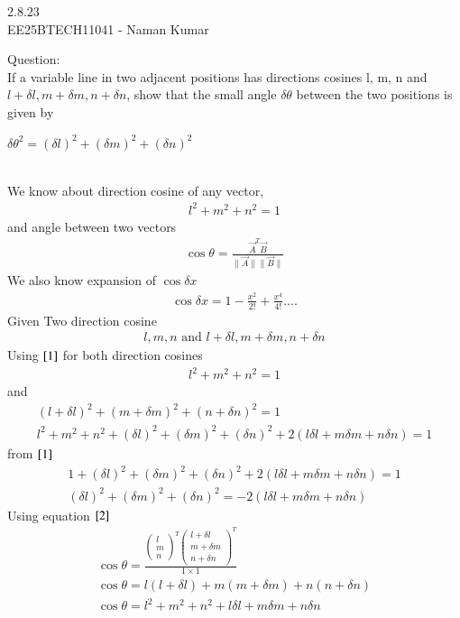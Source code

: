 \documentclass[journal]{IEEEtran}
\author{EE25BTECH11041-Naman Kumar }
\begin{document}
\begin{center}
    \huge{2.8.23}\\
    \large{EE25BTECH11041 - Naman Kumar}
\end{center}
Question:\\
If a variable line in two adjacent positions has directions cosines l, m, n and $l+\delta l, m+\delta m, n +\delta n$, show that the small angle $\delta\theta$ between the two positions is given by
\begin{center}
    $\delta\theta^2=(\delta l)^2+(\delta m)^2+(\delta n)^2$
\end{center}
\solution \\
We know about direction cosine of any vector,
\begin{align}
    l^2+m^2+n^2=1 \label{1}
\end{align}
and angle between two vectors
\begin{align}
    \cos{\theta}=\frac{\Vec{A}^T\Vec{B}}{\lVert\Vec{A}\rVert\lVert\Vec{B}\rVert} \label{2}
\end{align}
We also know expansion of $\cos{\delta x}$
\begin{align}
    \cos{\delta x}= 1-\frac{x^2}{2!}+\frac{x^4}{4!}.... \label{3}
\end{align}
Given Two direction cosine
\begin{align}
    l,m,n \text{ and } l+\delta l,m+\delta m,n+\delta n
\end{align}
Using $\eqref{1}$ for both direction cosines
\begin{align}
    l^2+m^2+n^2=1
\end{align}
and
\begin{align}
    (l+\delta l)^2+(m+\delta m)^2+(n+\delta n)^2=1\\
    l^2+m^2+n^2+(\delta l)^2+(\delta m)^2+(\delta n)^2+2(l\delta l+m\delta m+n\delta n)=1
\end{align}
from $\eqref{1}$
\begin{align}
    1+(\delta l)^2+(\delta m)^2+(\delta n)^2+2(l\delta l+m\delta m+n\delta n)=1\\
    (\delta l)^2+(\delta m)^2+(\delta n)^2=-2(l\delta l+m\delta m+n\delta n) \label{9}
\end{align}
Using equation $\eqref{2}$
\begin{align}
    \cos{\theta}=\frac{\begin{pmatrix}l\\m\\n\end{pmatrix}^T \begin{pmatrix}l+\delta l\\m+\delta m\\n+\delta n\end{pmatrix}^T}{1\times 1}\\
    \cos{\theta}=l(l+\delta l)+m(m+\delta m)+n(n+\delta n)\\
    \cos{\theta}=l^2+m^2+n^2+l\delta l+m\delta m+n\delta n\\
\end{align}
\end{document}

